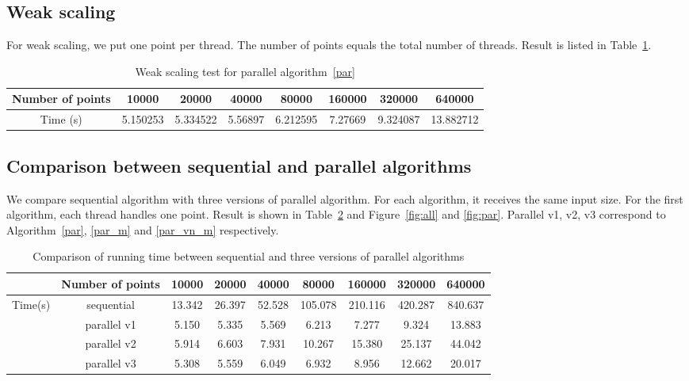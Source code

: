 \subsection{Weak scaling}
For weak scaling, we put one point per thread. The number of points equals the total number of threads.
Result is listed in Table~\ref{tab:weak-scaling}.
\begin{table}[ht]
  \centering
  \begin{tabular}{|c|c|c|c|c|c|c|c|}
    \hline
    Number of points	& 10000	& 20000	& 40000	& 80000	& 160000	& 320000	& 640000 \\
    \hline
    Time (s)	& 5.150253	& 5.334522	& 5.56897	& 6.212595	& 7.27669	& 9.324087	& 13.882712 \\
    \hline
  \end{tabular}
  \label{tab:weak-scaling}
  \caption{Weak scaling test for parallel algorithm~\ref{par}}
\end{table}

\subsection{Comparison between sequential and parallel algorithms}
We compare sequential algorithm with three versions of parallel algorithm. For each algorithm, it
receives the same input size. For the first algorithm, each thread handles one point. Result is shown in
Table~\ref{tab:comparison} and Figure~\ref{fig:all} and \ref{fig:par}. Parallel v1, v2, v3 correspond to
Algorithm~\ref{par}, \ref{par_m} and \ref{par_vn_m} respectively.   
\begin{table}[!h]
  \centering
  \begin{tabular}{|c|c|c|c|c|c|c|c|c|}
    \hline
    {}& Number of points	& 10000	& 20000	& 40000	& 80000	& 160000	& 320000	& 640000 \\
    \hline
    \multirow{4}{*}{Time(s)}	& sequential	& 13.342	& 26.397	& 52.528	& 105.078	& 210.116	& 420.287	& 840.637 \\
    \cline{2-9}
	  & parallel v1	& 5.150	& 5.335	& 5.569	& 6.213	& 7.277	& 9.324	& 13.883 \\
    \cline{2-9}
	  & parallel v2	& 5.914	& 6.603	& 7.931	& 10.267	& 15.380	& 25.137	& 44.042 \\
    \cline{2-9}
	  & parallel v3	& 5.308	& 5.559	& 6.049	& 6.932	& 8.956	& 12.662	& 20.017 \\
    \hline
  \end{tabular}
  \label{tab:comparison}
  \caption{Comparison of running time between sequential and three versions of parallel algorithms}
\end{table}

